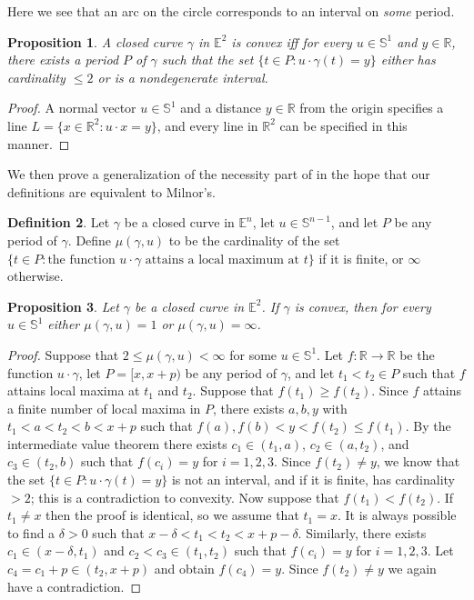 \documentclass{amsart}
\newtheorem{proposition}{Proposition}[section]
\theoremstyle{definition}
\newtheorem{definition}[proposition]{Definition}
\theoremstyle{remark}
\begin{document}
Here we see that an arc on the circle corresponds
to an interval on \emph{some} period.

\begin{proposition}
    A closed curve $\gamma$ in $\mathbb{E}^2$ is convex iff
    for every $u\in\mathbb{S}^1$ and $y\in\mathbb{R}$,
    there exists a period $P$ of $\gamma$ such that
    the set $\{t\in P:u\cdot\gamma(t)=y\}$ either
    has cardinality $\le2$ or is a nondegenerate interval.
\end{proposition}

\begin{proof}
    A normal vector $u\in\mathbb{S}^1$ and
    a distance $y\in\mathbb{R}$ from the origin specifies
    a line $L=\{x\in\mathbb{R}^2:u\cdot x=y\}$, and
    every line in $\mathbb{R}^2$ can be specified in this manner.
\end{proof}

We then prove a generalization of the necessity part
of \cite[Lemma 3.3]{milnor} in the hope that
our definitions are equivalent to Milnor's.

\begin{definition}
    Let $\gamma$ be a closed curve in $\mathbb{E}^n$,
    let $u\in\mathbb{S}^{n-1}$,
    and let $P$ be any period of $\gamma$.
    Define $\mu(\gamma,u)$ to be the cardinality of the set
    $\{t\in P:\text{the function }u\cdot\gamma\text{ attains a local maximum at }t\}$
    if it is finite, or $\infty$ otherwise.
\end{definition}

\begin{proposition}
    Let $\gamma$ be a closed curve in $\mathbb{E}^2$.
    If $\gamma$ is convex, then for every $u\in\mathbb{S}^1$
    either $\mu(\gamma,u)=1$ or $\mu(\gamma,u)=\infty$.
\end{proposition}

\begin{proof}
    Suppose that $2\le\mu(\gamma,u)<\infty$ for some $u\in\mathbb{S}^1$.
    Let $f:\mathbb{R}\to\mathbb{R}$ be the function $u\cdot\gamma$,
    let $P=[x,x+p)$ be any period of $\gamma$, and let $t_1<t_2\in P$
    such that $f$ attains local maxima at $t_1$ and $t_2$.
    Suppose that $f(t_1)\ge f(t_2)$.
    Since $f$ attains a finite number of local maxima in $P$,
    there exists $a,b,y$ with $t_1<a<t_2<b<x+p$ such that
    $f(a),f(b)<y<f(t_2)\le f(t_1)$.
    By the intermediate value theorem there exists
    $c_1\in(t_1,a)$, $c_2\in(a,t_2)$, and $c_3\in(t_2,b)$ such that
    $f(c_i)=y$ for $i=1,2,3$. Since $f(t_2)\ne y$, we know that
    the set $\{t\in P:u\cdot\gamma(t)=y\}$ is not an interval,
    and if it is finite, has cardinality $>2$; this is a contradiction
    to convexity. Now suppose that $f(t_1)<f(t_2)$.
    If $t_1\ne x$ then the proof is identical,
    so we assume that $t_1=x$. It is always possible to find
    a $\delta>0$ such that $x-\delta<t_1<t_2<x+p-\delta$.
    Similarly, there exists $c_1\in(x-\delta,t_1)$ and
    $c_2<c_3\in(t_1,t_2)$ such that $f(c_i)=y$ for $i=1,2,3$.
    Let $c_4=c_1+p\in(t_2,x+p)$ and obtain $f(c_4)=y$.
    Since $f(t_2)\ne y$ we again have a contradiction.
\end{proof}
\end{document}

